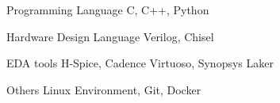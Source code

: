 

\begin{cvskills}
  \cvskill
  {Programming Language} %
  {C, C++, Python} %

  \cvskill
  {Hardware Design Language}
  {Verilog, Chisel}

  \cvskill
  {EDA tools}
  {H-Spice, Cadence Virtuoso, Synopsys Laker}

  \cvskill
  {Others}
  {Linux Environment, Git, Docker}
\end{cvskills}
